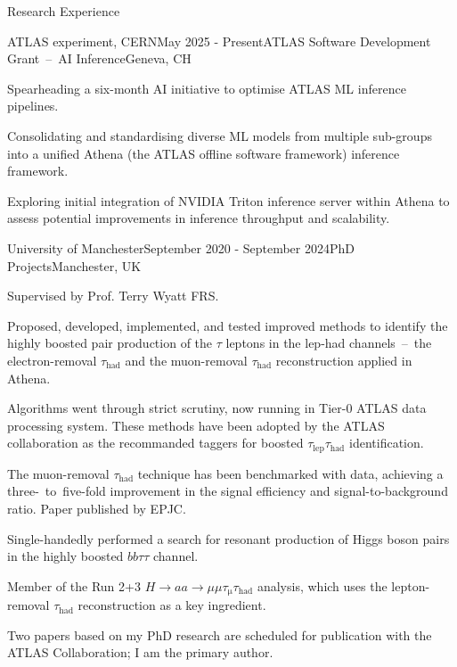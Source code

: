 \documentclass[11pt]{resume} %
\begin{document}
    \begin{rSection}{Research Experience}
        \begin{rSubsection}{ATLAS experiment, CERN}{May 2025 - Present}{ATLAS Software Development Grant~--~AI Inference}{Geneva, CH}
            \item Spearheading a six-month AI initiative to optimise ATLAS ML inference pipelines.
            \item Consolidating and standardising diverse ML models from multiple sub-groups into a unified Athena (the ATLAS offline software framework) inference framework.
            \item Exploring initial integration of NVIDIA Triton inference server within Athena to assess potential improvements in inference throughput and scalability.
        \end{rSubsection}
        \begin{rSubsection}{University of Manchester}{September 2020 - September 2024}{PhD Projects}{Manchester, UK}
            \item   Supervised by Prof. Terry Wyatt FRS. 
            \item   Proposed, developed, implemented, and tested improved methods to identify the highly boosted pair production of the $\tau$ leptons in the lep-had channels~--~the electron-removal $\tau_\mathrm{had}$ and the muon-removal $\tau_\mathrm{had}$ reconstruction applied in Athena.
            \item   Algorithms went through strict scrutiny, now running in Tier-0 ATLAS data processing system. These methods have been
                adopted by the ATLAS collaboration as the recommanded taggers for boosted $\tau_\mathrm{lep}\tau_\mathrm{had}$ identification.
            \item   The muon-removal $\tau_\mathrm{had}$ technique has been benchmarked with data, achieving a three-~to~five-fold 
                improvement in the signal efficiency and signal-to-background ratio. Paper published by EPJC.
            \item   Single-handedly performed a search for resonant production of Higgs boson pairs in the highly boosted $bb\tau\tau$ channel. 
            \item   Member of the Run 2+3 $H\rightarrow aa\rightarrow \mu\mu\tau_\mathrm{\mu}\tau_\mathrm{had}$ analysis, which uses the lepton-removal $\tau_\mathrm{had}$ reconstruction as a key ingredient.
            \item   Two papers based on my PhD research are scheduled for publication with the ATLAS Collaboration; I am the primary author.

\end{rSubsection}
\end{rSection}
\end{document}
